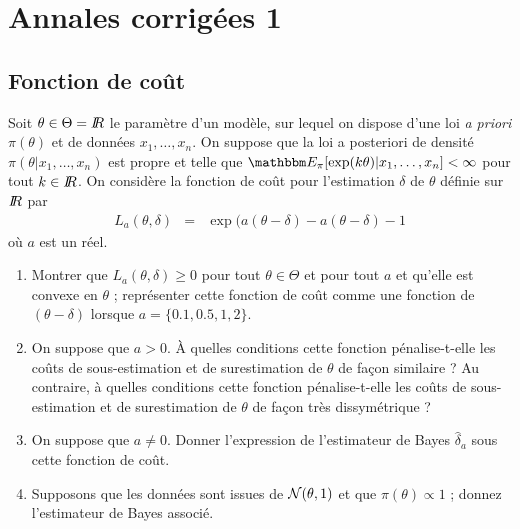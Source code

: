\section{Annales corrigées 1}\label{annales1}


\subsection{Fonction de coût}

Soit $\theta\in\Theta=I\!\!R$ le paramètre d'un modèle, sur lequel on dispose d'une loi {\it a priori} $\pi(\theta)$ et de données $x_1,\ldots,x_n$. On suppose que la loi a posteriori de densité  $\pi(\theta|x_1,\ldots,x_n)$ est propre et telle que $\E_{\pi}[\exp(k\theta)|x_1,\ldots,x_n]<\infty$ pour tout $k\in I\!\!R$. On considère la fonction de coût pour l'estimation $\delta$ de $\theta$ définie sur $I\!\!R$ par
\begin{eqnarray*}
L_a(\theta,\delta) & = & \exp(a(\theta-\delta) - a(\theta-\delta) - 1
\end{eqnarray*}
où $a$ est un réel.
\begin{enumerate}
\item Montrer que $L_a(\theta,\delta)\geq 0$ pour tout $\theta\in\Theta$ et pour tout $a$ et qu'elle est convexe en $\theta$ ; représenter cette fonction de coût comme une fonction de $(\theta-\delta)$ lorsque $a=\{0.1, 0.5, 1,2\}$. 
\item On suppose que $a>0$. \`A quelles conditions cette fonction pénalise-t-elle les coûts de sous-estimation et de surestimation de $\theta$ de fa\c con similaire ? Au contraire, à quelles conditions cette fonction pénalise-t-elle les coûts de sous-estimation et de surestimation de $\theta$ de fa\c con très dissymétrique ? 
\item On suppose que $a\neq 0$. Donner l'expression de l'estimateur de Bayes $\hat{\delta}_a$ sous cette fonction de coût.
\item Supposons que les données sont issues de ${\cal{N}}(\theta,1)$ et que $\pi(\theta)\propto 1$ ; donnez l'estimateur de Bayes associé.
\end{enumerate}


